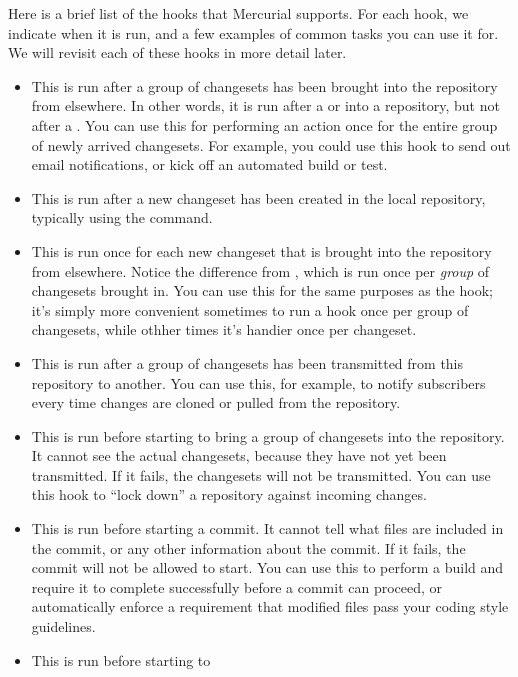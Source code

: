 Here is a brief list of the hooks that Mercurial supports. For each
hook, we indicate when it is run, and a few examples of common tasks
you can use it for.  We will revisit each of these hooks in more
detail later.
\begin{itemize}
\item[\small\hook{changegroup}] This is run after a group of
  changesets has been brought into the repository from elsewhere.  In
  other words, it is run after a  or  into a
  repository, but not after a .  You can use this for
  performing an action once for the entire group of newly arrived
  changesets.  For example, you could use this hook to send out email
  notifications, or kick off an automated build or test.
\item[\small\hook{commit}] This is run after a new changeset has been
  created in the local repository, typically using the 
  command.
\item[\small\hook{incoming}] This is run once for each new changeset
  that is brought into the repository from elsewhere.  Notice the
  difference from , which is run once per
  \emph{group} of changesets brought in.  You can use this for the
  same purposes as the  hook; it's simply more
  convenient sometimes to run a hook once per group of changesets,
  while othher times it's handier once per changeset.
\item[\small\hook{outgoing}] This is run after a group of changesets
  has been transmitted from this repository to another.  You can use
  this, for example, to notify subscribers every time changes are
  cloned or pulled from the repository.
\item[\small\hook{prechangegroup}] This is run before starting to
  bring a group of changesets into the repository.  It cannot see the
  actual changesets, because they have not yet been transmitted.  If
  it fails, the changesets will not be transmitted.  You can use this
  hook to ``lock down'' a repository against incoming changes.
\item[\small\hook{precommit}] This is run before starting a commit.
  It cannot tell what files are included in the commit, or any other
  information about the commit.  If it fails, the commit will not be
  allowed to start.  You can use this to perform a build and require
  it to complete successfully before a commit can proceed, or
  automatically enforce a requirement that modified files pass your
  coding style guidelines.
\item[\small\hook{preoutgoing}] This is run before starting to

\end{itemize}
